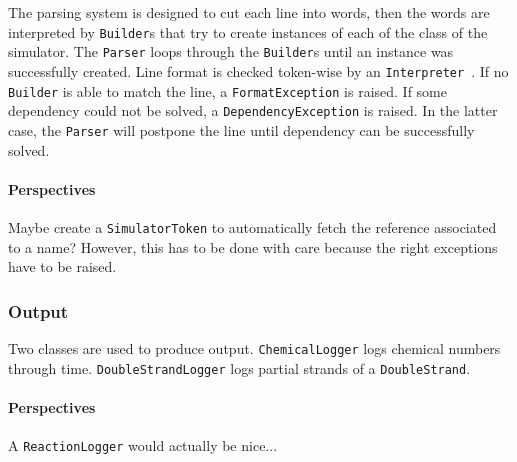 The parsing system is designed to cut each line into words, then the words are interpreted by \texttt{Builder}s that try to create instances of each of the class of the simulator. The \texttt{Parser} loops through the \texttt{Builder}s until an instance was successfully created. Line format is checked token-wise by an \texttt{Interpreter}~. If no \texttt{Builder} is able to match the line, a \texttt{FormatException} is raised. If some dependency could not be solved, a \texttt{DependencyException} is raised. In the latter case, the \texttt{Parser} will postpone the line until dependency can be successfully solved.

\paragraph{Perspectives} Maybe create a \texttt{SimulatorToken} to automatically fetch the reference associated to a name? However, this has to be done with care because the right exceptions have to be raised.

\subsubsection{Output}

Two classes are used to produce output. \texttt{ChemicalLogger} logs chemical numbers through time. \texttt{DoubleStrandLogger} logs partial strands of a \texttt{DoubleStrand}.

\paragraph{Perspectives} A \texttt{ReactionLogger} would actually be nice...
